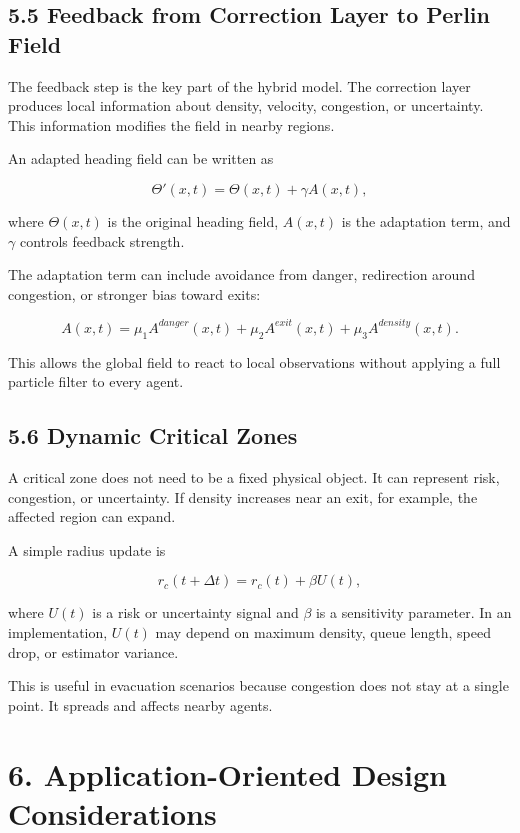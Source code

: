 \documentclass[
  11pt,
]{article}
\begin{document}
\subsection{5.5 Feedback from Correction Layer to Perlin
Field}\label{feedback-from-correction-layer-to-perlin-field}

The feedback step is the key part of the hybrid model. The correction
layer produces local information about density, velocity, congestion, or
uncertainty. This information modifies the field in nearby regions.

An adapted heading field can be written as

\[
\Theta'(x,t)
=
\Theta(x,t)
+
\gamma A(x,t),
\]

where \(\Theta(x,t)\) is the original heading field, \(A(x,t)\) is the
adaptation term, and \(\gamma\) controls feedback strength.

The adaptation term can include avoidance from danger, redirection
around congestion, or stronger bias toward exits:

\[
A(x,t)
=
\mu_1 A^{danger}(x,t)
+
\mu_2 A^{exit}(x,t)
+
\mu_3 A^{density}(x,t).
\]

This allows the global field to react to local observations without
applying a full particle filter to every agent.

\subsection{5.6 Dynamic Critical Zones}\label{dynamic-critical-zones}

A critical zone does not need to be a fixed physical object. It can
represent risk, congestion, or uncertainty. If density increases near an
exit, for example, the affected region can expand.

A simple radius update is

\[
r_c(t+\Delta t)
=
r_c(t)
+
\beta U(t),
\]

where \(U(t)\) is a risk or uncertainty signal and \(\beta\) is a
sensitivity parameter. In an implementation, \(U(t)\) may depend on
maximum density, queue length, speed drop, or estimator variance.

This is useful in evacuation scenarios because congestion does not stay
at a single point. It spreads and affects nearby agents.

\section{6. Application-Oriented Design
Considerations}\label{application-oriented-design-considerations}
\end{document}
